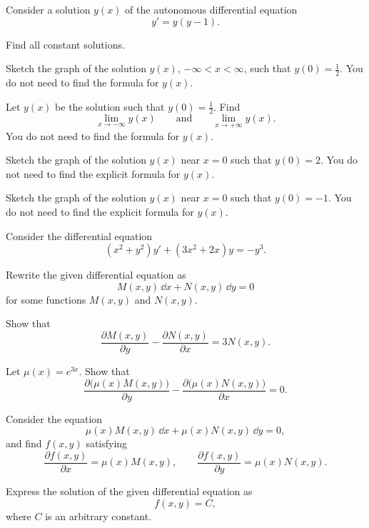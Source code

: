 \begin{problem}
Consider a solution $y(x)$ of the autonomous differential equation
\[
y'=y(y-1).
\]
\begin{problemsubparts}
\item Find all constant solutions.
\item Sketch the graph of the solution $y(x)$, $-\infty<x<\infty$, such that $y(0)=\frac12$. You do not need to find the formula for $y(x)$.
\item Let $y(x)$ be the solution such that $y(0)=\frac12$. Find
\[
\lim_{x\to-\infty}y(x)
\qquad\text{and}\qquad
\lim_{x\to+\infty}y(x).
\]
You do not need to find the formula for $y(x)$.
\item Sketch the graph of the solution $y(x)$ near $x=0$ such that $y(0)=2$. You do not need to find the explicit formula for $y(x)$.
\item Sketch the graph of the solution $y(x)$ near $x=0$ such that $y(0)=-1$. You do not need to find the explicit formula for $y(x)$.
\end{problemsubparts}
\end{problem}

\begin{problem}
Consider the differential equation
\[
(x^2+y^2)y'+(3x^2+2x)y=-y^3.
\]
\begin{problemsubparts}
\item Rewrite the given differential equation as
\[
M(x,y)\,\dd x+N(x,y)\,\dd y=0
\]
for some functions $M(x,y)$ and $N(x,y)$.
\item Show that
\[
\frac{\partial M(x,y)}{\partial y}
-\frac{\partial N(x,y)}{\partial x}
=3N(x,y).
\]
\item Let $\mu(x)=e^{3x}$. Show that
\[
\frac{\partial\bigl(\mu(x)M(x,y)\bigr)}{\partial y}
-\frac{\partial\bigl(\mu(x)N(x,y)\bigr)}{\partial x}
=0.
\]
\item Consider the equation
\[
\mu(x)M(x,y)\,\dd x+\mu(x)N(x,y)\,\dd y=0,
\]
and find $f(x,y)$ satisfying
\[
\frac{\partial f(x,y)}{\partial x}=\mu(x)M(x,y),
\qquad
\frac{\partial f(x,y)}{\partial y}=\mu(x)N(x,y).
\]
\item Express the solution of the given differential equation as
\[
f(x,y)=C,
\]
where $C$ is an arbitrary constant.
\end{problemsubparts}
\end{problem}

